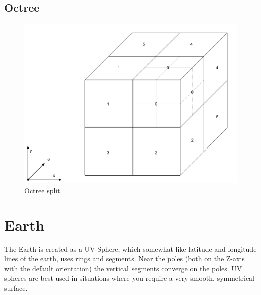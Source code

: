 \subsection{Octree}

\begin{figure}[H]
\caption[octree-split]{Octree split}
\label{fig:octree-split}
\centering
\includegraphics[width=\linewidth]{Figures/octree-split.png}
\decoRule
\end{figure}





\section{Earth}

The Earth is created as a UV Sphere, which somewhat like latitude and longitude lines of the earth, uses rings and segments. Near the poles (both on the Z-axis with the default orientation) the vertical segments converge on the poles. UV spheres are best used in situations where you require a very smooth, symmetrical surface.


